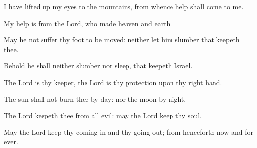 ﻿\item I have lifted up my eyes to the mountains, from whence help shall come to me.
\item My help is from the Lord, who made heaven and earth.
\item May he not suffer thy foot to be moved: neither let him slumber that keepeth thee.
\item Behold he shall neither slumber nor sleep, that keepeth Israel.
\item The Lord is thy keeper, the Lord is thy protection upon thy right hand.
\item The sun shall not burn thee by day: nor the moon by night.
\item The Lord keepeth thee from all evil: may the Lord keep thy soul.
\item May the Lord keep thy coming in and thy going out; from henceforth now and for ever.
